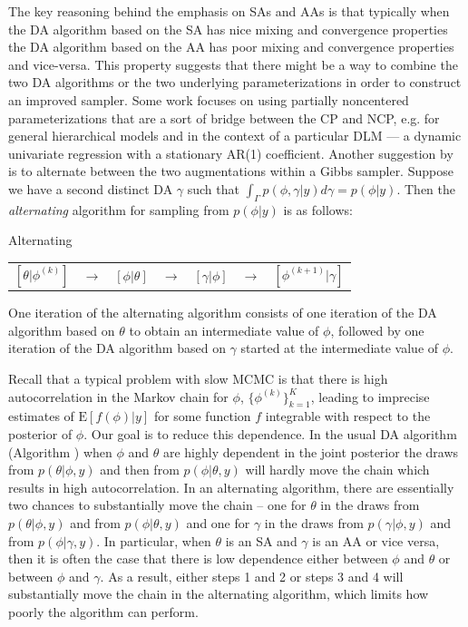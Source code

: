 \documentclass{article}
\begin{document}
The key reasoning behind the emphasis on SAs and AAs is that typically when the DA algorithm based on the SA has nice mixing and convergence properties the DA algorithm based on the AA has poor mixing and convergence properties and vice-versa. This property suggests that there might be a way to combine the two DA algorithms or the two underlying parameterizations in order to construct an improved sampler. Some work focuses on using partially noncentered parameterizations that are a sort of bridge between the CP and NCP, e.g.  for general hierarchical models and  in the context of a particular DLM --- a dynamic univariate regression with a stationary AR(1) coefficient. Another suggestion by  is to alternate between the two augmentations within a Gibbs sampler. Suppose we have a second distinct DA $\gamma$ such that $\int_\Gamma p(\phi,\gamma|y)d\gamma = p(\phi|y)$. Then the {\it alternating} algorithm for sampling from $p(\phi|y)$ is as follows:
\begin{alg*}[Alt]Alternating\label{alg:Alt} \\
  \begin{center}
    \begin{tabular}{lllllll}
  $[\theta|\phi^{(k)}]$& $\to$& $[\phi|\theta]$& $\to$& $[\gamma|\phi]$& $\to$& $[\phi^{(k+1)}|\gamma]$
    \end{tabular}
  \end{center}
\end{alg*}
\noindent One iteration of the alternating algorithm consists of one iteration of the DA algorithm based on $\theta$ to obtain an intermediate value of $\phi$, followed by one iteration of the DA algorithm based on $\gamma$ started at the intermediate value of $\phi$. 

Recall that a typical problem with slow MCMC is that there is high autocorrelation in the Markov chain for $\phi$, $\{\phi^{(k)}\}_{k=1}^K$, leading to imprecise estimates of $\mathrm{E}[f(\phi)|y]$ for some function $f$ integrable with respect to the posterior of $\phi$. Our goal is to reduce this dependence. In the usual DA algorithm (Algorithm ) when $\phi$ and $\theta$ are highly dependent in the joint posterior the draws from $p(\theta|\phi,y)$ and then from $p(\phi|\theta,y)$ will hardly move the chain which results in high autocorrelation. In an alternating algorithm, there are essentially two chances to substantially move the chain -- one for $\theta$ in the draws from $p(\theta|\phi,y)$ and from $p(\phi|\theta,y)$ and one for $\gamma$ in the draws from $p(\gamma|\phi,y)$ and from $p(\phi|\gamma,y)$.  In particular, when $\theta$ is an SA and $\gamma$ is an AA or vice versa, then it is often the case that there is low dependence either between $\phi$ and $\theta$ or between $\phi$ and $\gamma$. As a result, either steps 1 and 2 or steps 3 and 4 will substantially move the chain in the alternating algorithm, which limits how poorly the algorithm can perform.
\end{document}
